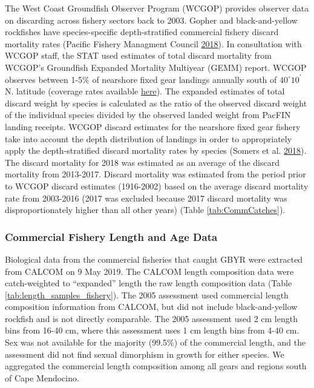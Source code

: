 \documentclass[12pt,]{article}
\begin{document}
The West Coast Groundfish Observer Program (WCGOP) provides observer
data on discarding across fishery sectors back to 2003. Gopher and
black-and-yellow rockfishes have species-specific depth-stratified
commercial fishery discard mortality rates (Pacific Fishery Managment
Council \protect\hyperlink{ref-PSMFC2018}{2018}). In consultation with
WCGOP staff, the STAT used estimates of total discard mortality from
WCGOP's Groundfish Expanded Mortality Multiyear (GEMM) report. WCGOP
observes between 1-5\% of nearshore fixed gear landings annually south
of \(40^\circ 10^\prime\) N. latitude (coverage rates available
\href{https://www.nwfsc.noaa.gov/research/divisions/fram/observation/data_products/sector_products.cfm\#ob}{here}).
The expanded estimates of total discard weight by species is calculated
as the ratio of the observed discard weight of the individual species
divided by the observed landed weight from PacFIN landing receipts.
WCGOP discard estimates for the nearshore fixed gear fishery take into
account the depth distribution of landings in order to appropriately
apply the depth-stratified discard mortality rates by species (Somers et
al. \protect\hyperlink{ref-Somers2018}{2018}). The discard mortality for
2018 was estimated as an average of the discard mortality from
2013-2017. Discard mortality was estimated from the period prior to
WCGOP discard estimates (1916-2002) based on the average discard
mortality rate from 2003-2016 (2017 was excluded because 2017 discard
mortality was disproportionately higher than all other years) (Table
\ref{tab:CommCatches}).

\subsubsection{Commercial Fishery Length and Age
Data}\label{commercial-fishery-length-and-age-data}

Biological data from the commercial fisheries that caught GBYR were
extracted from CALCOM on 9 May 2019. The CALCOM length composition data
were catch-weighted to ``expanded'' length the raw length composition
data (Table \ref{tab:length_samples_fishery}). The 2005 assessment used
commercial length composition information from CALCOM, but did not
include black-and-yellow rockfish and is not directly comparable. The
2005 assessment used 2 cm length bins from 16-40 cm, where this
assessment uses 1 cm length bins from 4-40 cm. Sex was not available for
the majority (99.5\%) of the commercial length, and the assessment did
not find sexual dimorphism in growth for either species. We aggregated
the commercial length composition among all gears and regions south of
Cape Mendocino.
\end{document}
